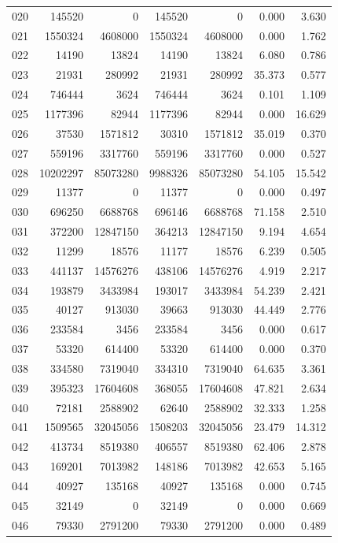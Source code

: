 \begin{longtable}{lrrrrrr}
020 & 145520 & 0 & 145520 & 0 & 0.000 & 3.630\\
021 & 1550324 & 4608000 & 1550324 & 4608000 & 0.000 & 1.762\\
022 & 14190 & 13824 & 14190 & 13824 & 6.080 & 0.786\\
023 & 21931 & 280992 & 21931 & 280992 & 35.373 & 0.577\\
024 & 746444 & 3624 & 746444 & 3624 & 0.101 & 1.109\\
025 & 1177396 & 82944 & 1177396 & 82944 & 0.000 & 16.629\\
026 & 37530 & 1571812 & 30310 & 1571812 & 35.019 & 0.370\\
027 & 559196 & 3317760 & 559196 & 3317760 & 0.000 & 0.527\\
028 & 10202297 & 85073280 & 9988326 & 85073280 & 54.105 & 15.542\\
029 & 11377 & 0 & 11377 & 0 & 0.000 & 0.497\\
030 & 696250 & 6688768 & 696146 & 6688768 & 71.158 & 2.510\\
031 & 372200 & 12847150 & 364213 & 12847150 & 9.194 & 4.654\\
032 & 11299 & 18576 & 11177 & 18576 & 6.239 & 0.505\\
033 & 441137 & 14576276 & 438106 & 14576276 & 4.919 & 2.217\\
034 & 193879 & 3433984 & 193017 & 3433984 & 54.239 & 2.421\\
035 & 40127 & 913030 & 39663 & 913030 & 44.449 & 2.776\\
036 & 233584 & 3456 & 233584 & 3456 & 0.000 & 0.617\\
037 & 53320 & 614400 & 53320 & 614400 & 0.000 & 0.370\\
038 & 334580 & 7319040 & 334310 & 7319040 & 64.635 & 3.361\\
039 & 395323 & 17604608 & 368055 & 17604608 & 47.821 & 2.634\\
040 & 72181 & 2588902 & 62640 & 2588902 & 32.333 & 1.258\\
041 & 1509565 & 32045056 & 1508203 & 32045056 & 23.479 & 14.312\\
042 & 413734 & 8519380 & 406557 & 8519380 & 62.406 & 2.878\\
043 & 169201 & 7013982 & 148186 & 7013982 & 42.653 & 5.165\\
044 & 40927 & 135168 & 40927 & 135168 & 0.000 & 0.745\\
045 & 32149 & 0 & 32149 & 0 & 0.000 & 0.669\\
046 & 79330 & 2791200 & 79330 & 2791200 & 0.000 & 0.489\\

\end{longtable}
